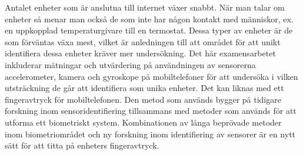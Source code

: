 Antalet enheter som är anslutna till internet växer snabbt. När man talar om enheter så menar man också de som inte har någon kontakt med människor, ex. en uppkopplad temperaturgivare till en termostat. Dessa typer av enheter är de som förväntas växa mest, vilket är anledningen till att området för att unikt identifiera dessa enheter kräver mer undersökning. Det här examensarbetet inkluderar mätningar och utvärdering på användningen av sensorerna accelerometer, kamera och gyroskope på mobiltelefoner för att undersöka i vilken utsträckning de går att identifiera som unika enheter. Det kan liknas med ett fingeravtryck för mobiltelefonen. Den metod som används bygger på tidigare forskning inom sensoridentifiering tillsammans med metoder som används för att utforma ett biometriskt system. Kombinationen av långa beprövade metoder inom biometriområdet och ny forskning inom identifiering av sensorer är en nytt sätt för att titta på enheters fingeravtryck.
